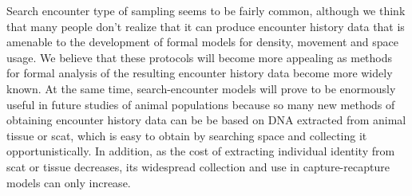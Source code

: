 Search encounter type of sampling seems to be fairly common, although
we think that many people don't realize that it can produce encounter
history data that is amenable to the development of formal models for
density, movement and space usage. We believe that these protocols
will become more appealing as methods for formal analysis of the
resulting encounter history data become more widely known.  At the
same time, search-encounter models will prove to be enormously useful
in future studies of animal populations because so many new methods of
obtaining encounter history data can be be based on DNA extracted from
animal tissue or scat, which is easy to obtain by searching space and
collecting it opportunistically.  In addition, as the cost of
extracting individual identity from scat or tissue decreases, its
widespread collection and use in capture-recapture models can only
increase.
